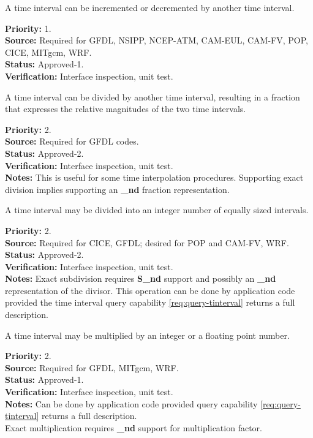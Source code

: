 A time interval can be incremented or decremented by another time interval.
\begin{reqlist}
{\bf Priority:} 1. \\
{\bf Source:} Required for GFDL, NSIPP, NCEP-ATM, CAM-EUL, CAM-FV, POP, CICE, MITgcm, WRF. \\
{\bf Status:} Approved-1. \\
{\bf Verification:} Interface inspection, unit test. 
\end{reqlist}

A time interval can be divided by another time interval, resulting in a
fraction that expresses the relative magnitudes of the two time intervals.
\begin{reqlist}
{\bf Priority:} 2. \\
{\bf Source:} Required for GFDL codes. \\
{\bf Status:} Approved-2. \\
{\bf Verification:} Interface inspection, unit test. \\
{\bf Notes:} This is useful for some time interpolation procedures.
Supporting exact division implies supporting an {\bf\_{nd}} fraction representation.
\end{reqlist}

A time interval may be divided into an integer number of equally sized intervals. 
\begin{reqlist}
{\bf Priority:} 2. \\
{\bf Source:} Required for CICE, GFDL; desired for POP and CAM-FV, WRF. \\
{\bf Status:} Approved-2. \\
{\bf Verification:} Interface inspection, unit test. \\
{\bf Notes:} Exact subdivision requires {\bf S\_nd} support and possibly an {\bf \_nd} 
representation of the divisor.  This operation can be done by application code 
provided the time interval query capability \ref{req:query-tinterval} returns a 
full description. 
\end{reqlist}

A time interval may be multiplied by an integer or a floating point number. 
\begin{reqlist}
{\bf Priority:} 2. \\
{\bf Source:} Required for GFDL, MITgcm, WRF. \\
{\bf Status:} Approved-1. \\
{\bf Verification:} Interface inspection, unit test. \\
{\bf Notes:}  Can be done by application code provided query capability 
\ref{req:query-tinterval} returns a full description. \\
Exact multiplication requires {\bf \_nd} support for multiplication factor.
\end{reqlist}

